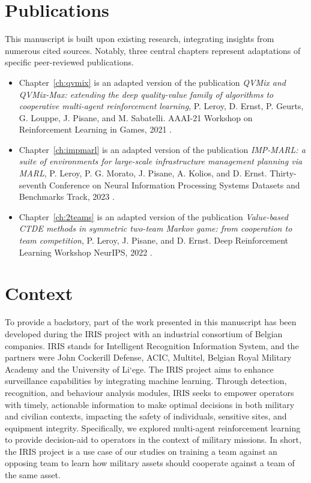 \section{Publications}
\label{sec:ch1_publications}

This manuscript is built upon existing research, integrating insights from numerous cited sources.
Notably, three central chapters represent adaptations of specific peer-reviewed publications.

\begin{itemize}
\item Chapter~\ref{ch:qvmix} is an adapted version of the publication \textit{QVMix and QVMix-Max: extending the deep quality-value family of algorithms to cooperative multi-agent reinforcement learning}, P. Leroy, D. Ernst, P. Geurts, G. Louppe, J. Pisane, and M. Sabatelli. AAAI-21 Workshop on Reinforcement Learning in Games, 2021 \citep{leroy2020qvmix}.

\item Chapter~\ref{ch:impmarl} is an adapted version of the publication \textit{IMP-MARL: a suite of environments for large-scale infrastructure management planning via MARL}, P. Leroy, P. G. Morato, J. Pisane, A. Kolios, and D. Ernst. Thirty-seventh Conference on Neural Information Processing Systems Datasets and Benchmarks Track, 2023 \citep{leroy2023impmarl}.

\item Chapter~\ref{ch:2teams} is an adapted version of the publication \textit{Value-based CTDE methods in symmetric two-team Markov game: from cooperation to team competition}, P. Leroy, J. Pisane, and D. Ernst. Deep Reinforcement Learning Workshop NeurIPS, 2022 \citep{leroy2022twoteam}.
\end{itemize}


\section{Context}
\label{sec:ch1_context}
To provide a backstory, part of the work presented in this manuscript has been developed during the IRIS project with an industrial consortium of Belgian companies.
IRIS stands for Intelligent Recognition Information System, and the partners were John Cockerill Defense, ACIC, Multitel, Belgian Royal Military Academy and the University of Li{`e}ge.
The IRIS project aims to enhance surveillance capabilities by integrating machine learning.
Through detection, recognition, and behaviour analysis modules, IRIS seeks to empower operators with timely, actionable information to make optimal decisions in both military and civilian contexts, impacting the safety of individuals, sensitive sites, and equipment integrity.
Specifically, we explored multi-agent reinforcement learning to provide decision-aid to operators in the context of military missions.
In short, the IRIS project is a use case of our studies on training a team against an opposing team to learn how military assets should cooperate against a team of the same asset.

